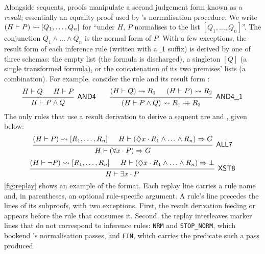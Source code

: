 Alongside sequents, proofs manipulate a second judgement form known as a
\emph{result}; essentially an equality proof used by \pp{}'s
normalisation procedure.
%
We write $(H \vdash P) \rightsquigarrow [Q_1, \ldots, Q_n]$ for
``under $H$, $P$ normalises to the list $[Q_1, \ldots, Q_n]$''.
The conjunction $Q_1 ∧ \ldots ∧ Q_n$ is the normal form of $P$.
%
With a few exceptions, the result form of each inference rule
(written with a $\mathsf{\_1}$ suffix) is derived by one of three schemas:
the empty list (the formula is discharged),
a singleton $[Q]$ (a single transformed formula),
or the concatenation of its two premises' lists (a combination).
%
For example, consider the  rule and its result form :
\[
\begin{prooftree}
\hypo{H \seq Q}
\hypo{H \seq P}
\infer2[\rn{AND4}]{H \seq P \land Q}
\end{prooftree}
\qquad
\begin{prooftree}
\hypo{(H \seq Q) \yields R_1}
\hypo{(H \seq P) \yields R_2}
\infer2[\rn{AND4\_1}]{(H \seq P \land Q) \yields R_1 \app R_2}
\end{prooftree}
\]
%
The only rules that use a result derivation to derive a sequent
are  and , given below:
\[
\begin{array}{c}
\begin{prooftree}
\hypo{(H \seq P) \yields [R_1, \ldots, R_n]}
\hypo{H \seq (\Dia x \cdot R_1 \land \ldots \land R_n) \Rightarrow G}
\infer2[\rn{ALL7}]{H \seq (\forall x \cdot P) \Rightarrow G}
\end{prooftree}
\\[5mm]
\begin{prooftree}
\hypo{(H \seq \lnot P) \yields [R_1, \ldots, R_n]}
\hypo{H \seq (\Dia x \cdot R_1 \land \ldots \land R_n) \Rightarrow \bot}
\infer2[\rn{XST8}]{H \seq \exists x \cdot P}
\end{prooftree}
\end{array}
\]
%
\noindent
\autoref{fig:replay} shows an example of the \replay{} format.
%
Each replay line carries a rule name and, in parentheses, an optional
rule-specific argument.
%
A rule's line precedes the lines of its subproofs, with two exceptions.
%
First, the result derivation feeding  or  appears
before the rule that consumes it.
%
Second, the replay interleaves marker lines that do not correspond to
inference rules: \texttt{NRM} and \texttt{STOP\_NORM}, which bookend
\pp's normalisation passes, and \texttt{FIN}, which carries the predicate
such a pass produced.
%

